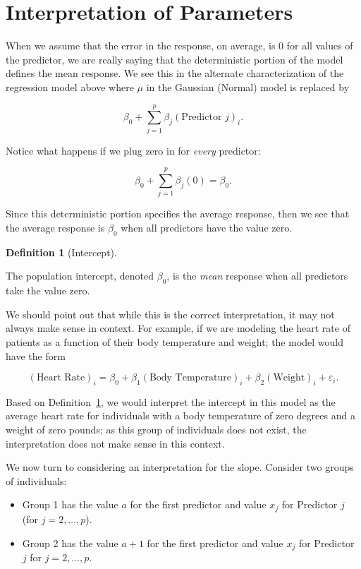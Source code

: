 \documentclass[
  letterpaper,
  DIV=11,
  numbers=noendperiod]{scrreprt}
\providecommand{\tightlist}{%
  \setlength{\itemsep}{0pt}\setlength{\parskip}{0pt}}\usepackage{longtable,booktabs,array}
\theoremstyle{definition}
\newtheorem{definition}{Definition}[chapter]
\theoremstyle{definition}
\theoremstyle{remark}
\begin{document}
\hypertarget{interpretation-of-parameters}{%
\section{Interpretation of
Parameters}\label{interpretation-of-parameters}}

When we assume that the error in the response, on average, is 0 for all
values of the predictor, we are really saying that the deterministic
portion of the model defines the mean response. We see this in the
alternate characterization of the regression model above where \(\mu\)
in the Gaussian (Normal) model is replaced by

\[\beta_0 + \sum_{j=1}^{p} \beta_j (\text{Predictor } j)_i.\]

Notice what happens if we plug zero in for \emph{every} predictor:

\[\beta_0 + \sum_{j=1}^{p} \beta_j (0) = \beta_0.\]

Since this deterministic portion specifies the average response, then we
see that the average response is \(\beta_0\) when all predictors have
the value zero.

\begin{definition}[Intercept]\protect\hypertarget{def-intercept}{}\label{def-intercept}

The population intercept, denoted \(\beta_0\), is the \emph{mean}
response when all predictors take the value zero.

\end{definition}

We should point out that while this is the correct interpretation, it
may not always make sense in context. For example, if we are modeling
the heart rate of patients as a function of their body temperature and
weight; the model would have the form

\[(\text{Heart Rate})_i = \beta_0 + \beta_1 (\text{Body Temperature})_i + \beta_2 (\text{Weight})_i + \varepsilon_i.\]

Based on Definition~\ref{def-intercept}, we would interpret the
intercept in this model as the average heart rate for individuals with a
body temperature of zero degrees and a weight of zero pounds; as this
group of individuals does not exist, the interpretation does not make
sense in this context.

We now turn to considering an interpretation for the slope. Consider two
groups of individuals:

\begin{itemize}
\tightlist
\item
  Group 1 has the value \(a\) for the first predictor and value \(x_j\)
  for Predictor \(j\) (for \(j = 2, \dotsc, p\)).
\item
  Group 2 has the value \(a + 1\) for the first predictor and value
  \(x_j\) for Predictor \(j\) for \(j = 2, \dotsc, p\).
\end{itemize}
\end{document}
